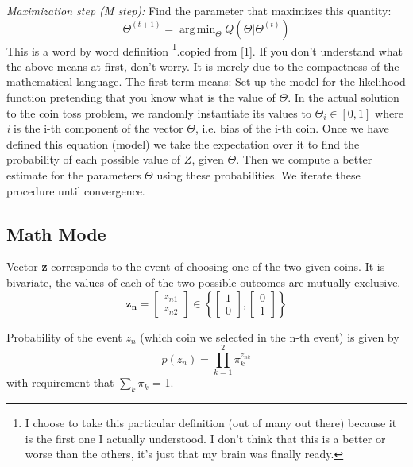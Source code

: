 \documentclass[11pt]{article}
\DeclareMathOperator*{\argminA}{arg\,min}
\begin{document}
\textit{Maximization step (M step):} Find the parameter that maximizes this quantity:
\begin{equation}
\Theta^{(t+1)}=\argminA_\Theta Q(\Theta|\Theta^{(t)})
\end{equation}
This is a word by word definition \footnote{I choose to take this particular definition (out of many out there) because it is the first one I actually understood. I don't think that this is a better or worse than the others, it's just that my brain was finally ready.}.copied from [1].
If you don't understand what the above means at first, don't worry. It is merely due to the compactness of the mathematical language. The first term means: Set up the model for the likelihood function pretending that you know what is the value of $\Theta$. In the actual solution to the coin toss problem, we randomly instantiate its values to $\Theta_i \in [0,1]$ where \textit{i} is the i-th component of the vector $\Theta$, i.e. bias of the i-th coin. Once we have defined this equation (model) we take the expectation over it to find the probability of each possible value of $Z$, given $\Theta$. Then we compute a better estimate for the parameters $\Theta$ using these probabilities. We iterate these procedure until convergence.
\subsection{Math Mode}\label{section:mathmode}
Vector \textbf{z} corresponds to the event of choosing one of the two given coins. It is bivariate, the values of each of the two possible outcomes are mutually exclusive.
\begin{equation}
\bm{z_{n}} = \begin{bmatrix}
z_{n1} \\
z_{n2}
\end{bmatrix}
\in \left \{
\begin{bmatrix}
{1} \\
{0}
\end{bmatrix},
\begin{bmatrix}
{0} \\
{1}
\end{bmatrix}
\right \}
\end{equation}

Probability of the event $z_n$ (which coin we selected in the n-th event) is given by
\begin{equation}
p(z_{n}) = \prod_{k=1}^{2} \pi_{k}^{z_{nk}}
\end{equation}
with requirement that $\sum_{k}\pi_{k}$ = 1.
\end{document}
